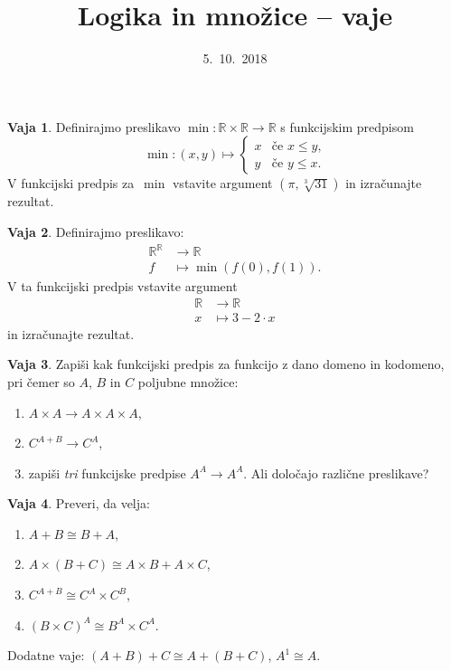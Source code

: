 \documentclass{article}
\newcommand{\RR}{\mathbb{R}}
\theoremstyle{definition}
\newtheorem{vaja}{Vaja}
\begin{document}
\title{Logika in množice -- vaje}
\date{5.~10.~2018}
\maketitle

\begin{vaja}
  Definirajmo preslikavo $\min : \RR \times \RR \to \RR$ s funkcijskim predpisom
  \begin{equation*}
    \min : (x, y) \mapsto
    \begin{cases}
      x & \text{če $x \leq y$,} \\
      y & \text{če $y \leq x$.}
    \end{cases}
  \end{equation*}
  V funkcijski predpis za~$\min$ vstavite argument $(\pi, \sqrt[3]{31})$ in izračunajte
  rezultat.
\end{vaja}

\begin{vaja}
  Definirajmo preslikavo:
  \begin{align*}
    \RR^\RR &\to \RR \\
    f &\mapsto \min (f(0), f(1)).
  \end{align*}
  V ta funkcijski predpis vstavite argument
  \begin{align*}
    \RR &\to \RR \\
    x &\mapsto 3 - 2 \cdot x
  \end{align*}
  in izračunajte rezultat.
\end{vaja}


\begin{vaja}
  Zapiši kak funkcijski predpis za funkcijo z dano domeno in kodomeno,
  pri čemer so $A$, $B$ in $C$ poljubne množice:
  \begin{enumerate}
  \item $A \times A \to A \times A \times A$,
  \item $C^{A+B} \to C^A$,
  \item zapiši \emph{tri} funkcijske predpise $A^A \to A^A$. Ali določajo različne preslikave?
  \end{enumerate}
\end{vaja}

\begin{vaja}
  Preveri, da velja:
  \begin{enumerate}
  \item $A + B \cong B + A$,
  \item $A \times (B + C) \cong A \times B + A \times C$,
  \item $C^{A + B} \cong C^A \times C^B$,
  \item $(B \times C)^A \cong B^A \times C^A$.
  \end{enumerate}
  Dodatne vaje: $(A + B) + C \cong A + (B + C)$, $A^1 \cong A$.
\end{vaja}
\end{document}
